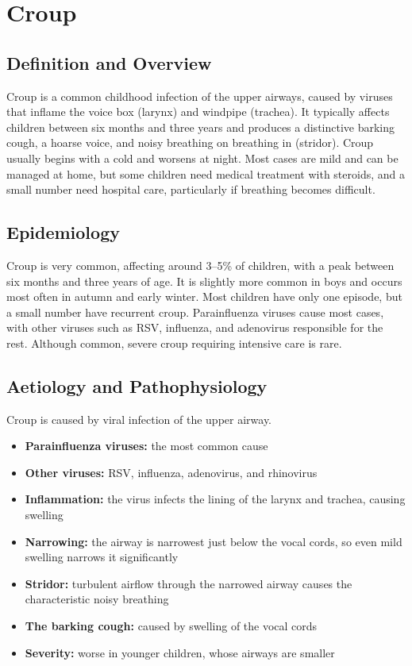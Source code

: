 \chapter{Croup}

\section*{Definition and Overview}
Croup is a common childhood infection of the upper airways, caused by viruses that inflame the voice box (larynx) and windpipe (trachea). It typically affects children between six months and three years and produces a distinctive barking cough, a hoarse voice, and noisy breathing on breathing in (stridor). Croup usually begins with a cold and worsens at night. Most cases are mild and can be managed at home, but some children need medical treatment with steroids, and a small number need hospital care, particularly if breathing becomes difficult.

\section*{Epidemiology}
Croup is very common, affecting around 3--5\% of children, with a peak between six months and three years of age. It is slightly more common in boys and occurs most often in autumn and early winter. Most children have only one episode, but a small number have recurrent croup. Parainfluenza viruses cause most cases, with other viruses such as RSV, influenza, and adenovirus responsible for the rest. Although common, severe croup requiring intensive care is rare.

\section*{Aetiology and Pathophysiology}
Croup is caused by viral infection of the upper airway.

\begin{itemize}
    \item \textbf{Parainfluenza viruses:} the most common cause
    \item \textbf{Other viruses:} RSV, influenza, adenovirus, and rhinovirus
    \item \textbf{Inflammation:} the virus infects the lining of the larynx and trachea, causing swelling
    \item \textbf{Narrowing:} the airway is narrowest just below the vocal cords, so even mild swelling narrows it significantly
    \item \textbf{Stridor:} turbulent airflow through the narrowed airway causes the characteristic noisy breathing
    \item \textbf{The barking cough:} caused by swelling of the vocal cords
    \item \textbf{Severity:} worse in younger children, whose airways are smaller
\end{itemize}

